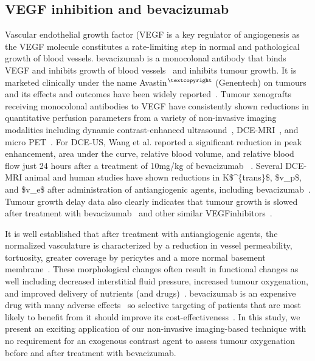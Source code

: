 \subsection{VEGF inhibition and bevacizumab}

Vascular endothelial growth factor (\acs{VEGF} is a key regulator of angiogenesis as the \acs{VEGF} molecule constitutes a rate-limiting step in normal and pathological growth of blood vessels.
bevacizumab is a monocolonal antibody that binds \acs{VEGF} and inhibits growth of blood vessels~\cite{Ferrara:2004fa} and inhibits tumour growth.
It is marketed clinically under the name Avastin$^{\tiny{\textcopyright}}$ (Genentech) on tumours and its effects and outcomes have been widely reported~\cite{Keating:2014gt, Pavlidis:2013bj, Barnett:2013bt, Kumler:2014gb}.
Tumour xenografts receiving monocolonal antibodies to VEGF have consistently shown reductions in quantitative perfusion parameters from a variety of non-invasive imaging modalities including dynamic contrast-enhanced ultrasound~\cite{Wang:2015bb}, \acs{DCE-MRI}~\cite{OConnor:2009cg}, and micro PET~\cite{Nagengast:2007hx}.
For \acs{DCE-US}, Wang et al. reported a significant reduction in peak enhancement, area under the curve, relative blood volume, and relative blood flow just 24 hours after a treatment of 10mg/kg of bevacizumab~\cite{Wang:2015bb} .  
Several DCE-MRI animal and human studies have shown reductions in \acs{K$^{trans}$}, \acs{$v_p$}, and \acs{$v_e$} after administration of antiangiogenic agents, including bevacizumab~\cite{Yang:2018hz}.
Tumour growth delay data also clearly indicates that tumour growth is slowed after treatment with bevacizumab~\cite{Yang:2018hz} and other similar \acs{VEGF}inhibitors~\cite{OConnor:2012ie}.

It is well established that after treatment with antiangiogenic agents, the normalized vasculature is characterized by a reduction in vessel permeability, tortuosity, greater coverage by pericytes and a more normal basement membrane~\cite{Jain:2005gk}. 
These morphological changes often result in functional changes as well including decreased interstitial fluid pressure, increased tumour oxygenation, and improved delivery of nutrients (and drugs)~\cite{Jain:2005gk}.
bevacizumab is an expensive drug with many adverse effects~\cite{Keating:2014gt} so selective targeting of patients that are most likely to benefit from it should improve its cost-effectiveness~\cite{Barnett:2013bt}.
In this study, we present an exciting application of our non-invasive imaging-based technique with no requirement for an exogenous contrast agent to assess tumour oxygenation before and after treatment with bevacizumab.


